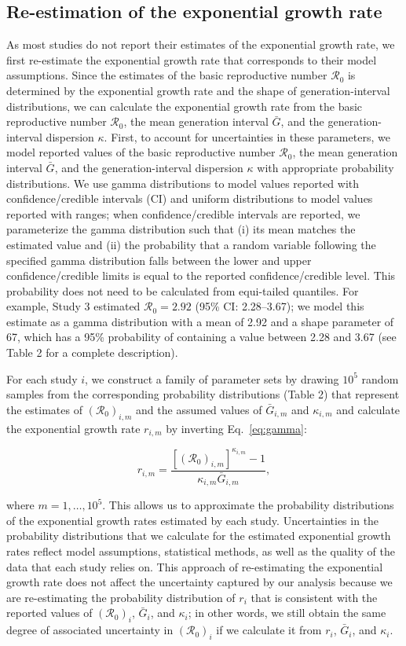 \documentclass[12pt]{article}
\newcommand{\eref}[1]{Eq.~\ref{eq:#1}}
\newcommand{\Ro}{\ensuremath{{\mathcal R}_{0}}\xspace}
\begin{document}
\subsection{Re-estimation of the exponential growth rate}

As most studies do not report their estimates of the exponential growth rate, we first re-estimate the exponential growth rate that corresponds to their model assumptions.
Since the estimates of the basic reproductive number \Ro is determined by the exponential growth rate and the shape of generation-interval distributions, we can calculate the exponential growth rate from the basic reproductive number \Ro, the mean generation interval $\bar G$, and the generation-interval dispersion $\kappa$.
First, to account for uncertainties in these parameters, we model reported values of the basic reproductive number \Ro, the mean generation interval $\bar G$, and the generation-interval dispersion $\kappa$ with appropriate probability distributions.
We use gamma distributions to model values reported with confidence/credible intervals (CI) and uniform distributions to model values reported with ranges;
when confidence/credible intervals are reported, we parameterize the gamma distribution such that (i) its mean matches the estimated value and (ii) the probability that a random variable following the specified gamma distribution falls between the lower and upper confidence/credible limits is equal to the reported confidence/credible level. 
This probability does not need to be calculated from equi-tailed quantiles.
For example, Study 3 estimated $\Ro = 2.92$ (95\% CI: 2.28--3.67);
we model this estimate as a gamma distribution with a mean of 2.92 and a shape parameter of 67, which has a 95\% probability of containing a value between 2.28 and 3.67 (see Table 2 for a complete description).

For each study $i$, we construct a family of parameter sets by drawing $10^5$ random samples from the corresponding probability distributions (Table 2) that represent the estimates of $(\Ro)_{i,m}$ and the assumed values of $\bar G_{i,m}$ and $\kappa_{i,m}$ and calculate the exponential growth rate $r_{i,m}$ by inverting \eref{gamma}:
\begin{linenomath*}
\begin{equation}
r_{i,m} = \frac{\left[(\Ro)_{i,m}\right]^{\kappa_{i,m}} - 1}{\kappa_{i,m} \bar{G}_{i,m}},
\end{equation}
\end{linenomath*}
where $m=1,\dots,10^5$.
This allows us to approximate the probability distributions of the exponential growth rates estimated by each study.
Uncertainties in the probability distributions that we calculate for the estimated exponential growth rates reflect model assumptions, statistical methods, as well as the quality of the data that each study relies on.
This approach of re-estimating the exponential growth rate does not affect the uncertainty captured by our analysis because we are re-estimating the probability distribution of $r_i$ that is consistent with the reported values of $(\Ro)_i$, $\bar G_i$, and $\kappa_i$;
in other words, we still obtain the same degree of associated uncertainty in $(\Ro)_i$ if we calculate it from $r_i$, $\bar G_i$, and $\kappa_i$.
\end{document}
